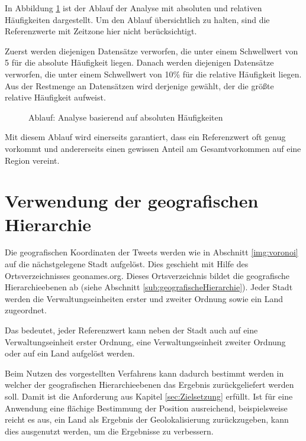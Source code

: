 				In Abbildung \ref{img:relHaufBsp} ist der Ablauf der Analyse mit absoluten und relativen Häufigkeiten dargestellt.
				Um den Ablauf übersichtlich zu halten, sind die Referenzwerte mit Zeitzone hier nicht berücksichtigt.
				
				Zuerst werden diejenigen Datensätze verworfen, die unter einem Schwellwert von 5 für die absolute Häufigkeit liegen.
				Danach werden diejenigen Datensätze verworfen, die unter einem Schwellwert von 10\% für die relative Häufigkeit liegen.
				Aus der Restmenge an Datensätzen wird derjenige gewählt, der die größte relative Häufigkeit aufweist. 

				 \begin{figure}[!ht]
	
						\centering
						\caption{Ablauf: Analyse basierend auf absoluten Häufigkeiten}
						\label{img:relHaufBsp}
					
				\end{figure}

				Mit diesem Ablauf wird einerseits garantiert, dass ein Referenzwert oft genug vorkommt und andererseits einen gewissen Anteil am Gesamtvorkommen auf eine Region vereint.

	\section{Verwendung der geografischen Hierarchie} \label{sec:ausnutzenDerGeografischenHierarchie}

		Die geografischen Koordinaten der Tweets werden wie in Abschnitt \ref{img:voronoi} auf die nächstgelegene Stadt aufgelöst. 
		Dies geschieht mit Hilfe des Ortsverzeichnisses geonames.org. 	
		Dieses Ortsverzeichnis bildet die geografische Hierarchieebenen ab (siehe Abschnitt \ref{sub:geografischeHierarchie}). 
		Jeder Stadt werden die Verwaltungseinheiten erster und zweiter Ordnung sowie ein Land zugeordnet.

		Das bedeutet, jeder Referenzwert kann neben der Stadt auch auf eine Verwaltungseinheit erster Ordnung, eine Verwaltungseinheit zweiter Ordnung oder auf ein Land aufgelöst werden.
		
		Beim Nutzen des vorgestellten Verfahrens kann dadurch bestimmt werden in welcher der geografischen Hierarchieebenen das Ergebnis zurückgeliefert werden soll. 
		Damit ist die Anforderung aus Kapitel \ref{sec:Zielsetzung} erfüllt.
		Ist für eine Anwendung eine flächige Bestimmung der Position ausreichend, beispielsweise reicht es aus, ein Land als Ergebnis der Geolokalisierung zurückzugeben, kann dies ausgenutzt werden, um die Ergebnisse zu verbessern.

